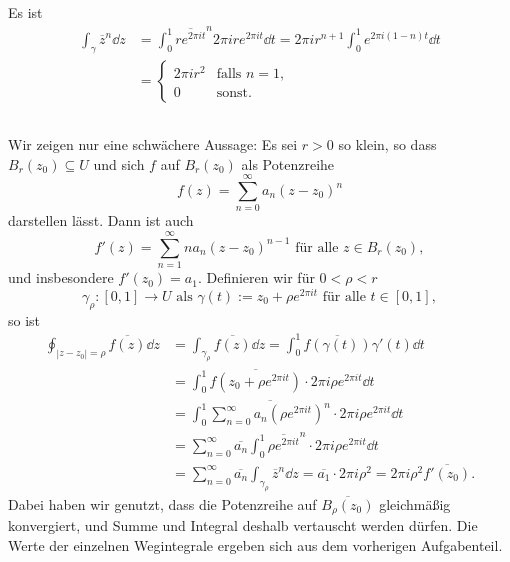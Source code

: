 \documentclass[a4paper,10pt]{article}
\begin{document}
\subsection{}
Es ist
\begin{align*}
 \int_\gamma \overline{z}^n \dd{z}
 &= \int_0^1 \overline{r e^{2\pi i t}}^n 2\pi i r e^{2\pi i t} \dd{t}
 = 2\pi i r^{n+1} \int_0^1 e^{2\pi i (1-n) t} \dd{t} \\
 &= \begin{cases} 2\pi i r^2 & \text{falls } n=1, \\ 0 & \text{sonst}. \end{cases}
\end{align*}


\subsection{}
Wir zeigen nur eine schwächere Aussage: Es sei $r > 0$ so klein, so dass $B_r(z_0) \subseteq U$ und sich $f$ auf $B_r(z_0)$ als Potenzreihe
\[
 f(z) = \sum_{n=0}^\infty a_n (z-z_0)^n
\]
darstellen lässt. Dann ist auch
\[
 f'(z) = \sum_{n=1}^\infty n a_n (z-z_0)^{n-1} \text{ für alle } z \in B_r(z_0),
\]
und insbesondere $f'(z_0) = a_1$. Definieren wir für $0 <\rho < r$
\[
 \gamma_\rho : [0,1] \to U \text{ als } \gamma(t) := z_0 + \rho e^{2\pi i t} \text{ für alle } t \in [0,1],
\]
so ist
\begin{align*}
 \oint_{|z-z_0| = \rho} \overline{f(z)} \dd{z}
 &= \int_{\gamma_\rho} \overline{f(z)} \dd{z}
 = \int_0^1 \overline{f(\gamma(t))}\gamma'(t) \dd{t} \\
 &= \int_0^1 \overline{f(z_0 + \rho e^{2\pi i t})} \cdot 2 \pi i \rho e^{2\pi it} \dd{t} \\
 &= \int_0^1 \overline{\sum_{n=0}^\infty a_n \left(\rho e^{2\pi i t}\right)^n} \cdot 2 \pi i \rho e^{2\pi i t} \dd{t}\\
 &= \sum_{n=0}^\infty \overline{a_n} \int_0^1 \overline{\rho e^{2\pi i t}}^n \cdot 2 \pi i \rho e^{2\pi i t} \dd{t}\\
 &= \sum_{n=0}^\infty \overline{a_n} \int_{\gamma_\rho} \overline{z}^n \dd{z}
 = \overline{a_1} \cdot 2 \pi i \rho^2
 = 2 \pi i \rho^2 \overline{f'(z_0)}.
\end{align*}
Dabei haben wir genutzt, dass die Potenzreihe auf $\overline{B_\rho(z_0)}$ gleichmäßig konvergiert, und Summe und Integral deshalb vertauscht werden dürfen. Die Werte der einzelnen Wegintegrale ergeben sich aus dem vorherigen Aufgabenteil.
\end{document}
